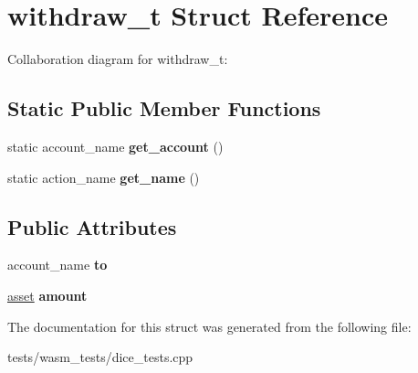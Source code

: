\hypertarget{structwithdraw__t}{}\section{withdraw\+\_\+t Struct Reference}
\label{structwithdraw__t}


Collaboration diagram for withdraw\+\_\+t\+:
\subsection*{Static Public Member Functions}
\begin{DoxyCompactItemize}
\item 
\mbox{\label{structwithdraw__t_ae0e2e2cece0cc755d122d2feb58ac1ad}} 
static account\+\_\+name {\bfseries get\+\_\+account} ()
\item 
\mbox{\label{structwithdraw__t_ac533aff5fd748a352f66dcebc4c7ab87}} 
static action\+\_\+name {\bfseries get\+\_\+name} ()
\end{DoxyCompactItemize}
\subsection*{Public Attributes}
\begin{DoxyCompactItemize}
\item 
\mbox{\label{structwithdraw__t_a907f7c501a6386fd4d802da604f8a1d3}} 
account\+\_\+name {\bfseries to}
\item 
\mbox{\label{structwithdraw__t_a104e7901e2bdd3f1c926642db937c423}} 
\mbox{\hyperlink{structaacio_1_1asset}{asset}} {\bfseries amount}
\end{DoxyCompactItemize}


The documentation for this struct was generated from the following file\+:\begin{DoxyCompactItemize}
\item 
tests/wasm\+\_\+tests/dice\+\_\+tests.\+cpp\end{DoxyCompactItemize}
